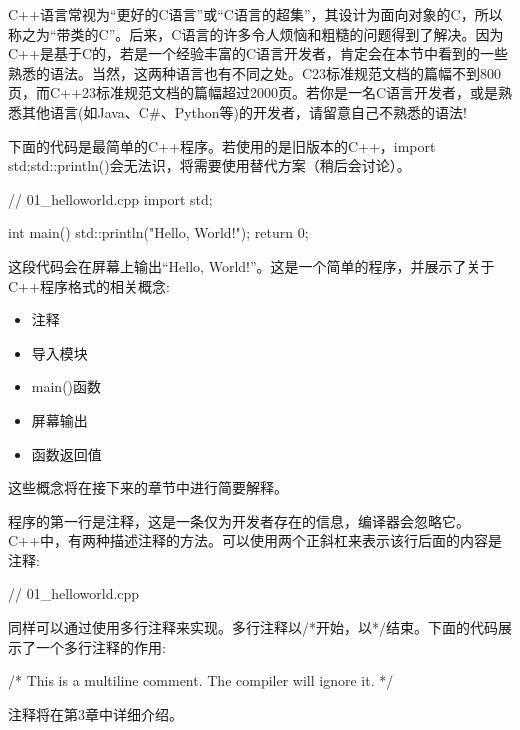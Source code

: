 
C++语言常视为“更好的C语言”或“C语言的超集”，其设计为面向对象的C，所以称之为“带类的C”。后来，C语言的许多令人烦恼和粗糙的问题得到了解决。因为C++是基于C的，若是一个经验丰富的C语言开发者，肯定会在本节中看到的一些熟悉的语法。当然，这两种语言也有不同之处。C23标准规范文档的篇幅不到800页，而C++23标准规范文档的篇幅超过2000页。若你是一名C语言开发者，或是熟悉其他语言(如Java、C\#、Python等)的开发者，请留意自己不熟悉的语法!


下面的代码是最简单的C++程序。若使用的是旧版本的C++，import  std;std::println()会无法识，将需要使用替代方案（稍后会讨论）。

\begin{cpp}
// 01_helloworld.cpp
import std;

int main()
{
    std::println("Hello, World!");
    return 0;
}
\end{cpp}

这段代码会在屏幕上输出“Hello, World!”。这是一个简单的程序，并展示了关于C++程序格式的相关概念:

\begin{itemize}
\item
注释

\item
导入模块

\item
main()函数

\item
屏幕输出

\item
函数返回值
\end{itemize}

这些概念将在接下来的章节中进行简要解释。


程序的第一行是注释，这是一条仅为开发者存在的信息，编译器会忽略它。C++中，有两种描述注释的方法。可以使用两个正斜杠来表示该行后面的内容是注释:

\begin{cpp}
// 01_helloworld.cpp
\end{cpp}

同样可以通过使用多行注释来实现。多行注释以/*开始，以*/结束。下面的代码展示了一个多行注释的作用:

\begin{cpp}
/* This is a multiline comment.
   The compiler will ignore it.
*/
\end{cpp}

注释将在第3章中详细介绍。

